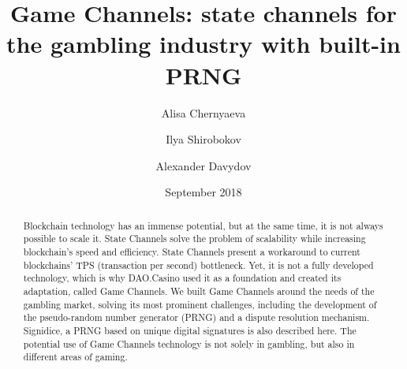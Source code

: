 \documentclass[tikz, 12pt]{article}
\title {Game Channels: state channels for the gambling industry with built-in PRNG}
\author {Alisa Chernyaeva}
\author{Ilya Shirobokov}
\author{Alexander Davydov}
\affil{Research department, DAO.Casino Company}
\affil{ \href{mailto:research@dao.casino}{research@dao.casino}}
\date {September 2018}
\theoremstyle{definition}
\theoremstyle{remark}
\begin{document}
\maketitle
	\begin{abstract}
Blockchain technology has an immense potential, but at the same time, it is not always possible to scale it. State Channels solve the problem of scalability while increasing blockchain's speed and efficiency. State Channels present a workaround to current blockchains' TPS (transaction per second) bottleneck. Yet, it is not a fully developed technology, which is why DAO.Casino used it as a foundation and created its adaptation, called Game Channels. We built Game Channels around the needs of the gambling market, solving its most prominent challenges, including the development of the pseudo-random number generator (PRNG) and a dispute resolution mechanism. Signidice, a PRNG based on unique digital signatures is also described here. The potential use of Game Channels technology is not solely in gambling, but also in different areas of gaming.

	\end{abstract}
\tableofcontents	
	
	
		
\end{document}
